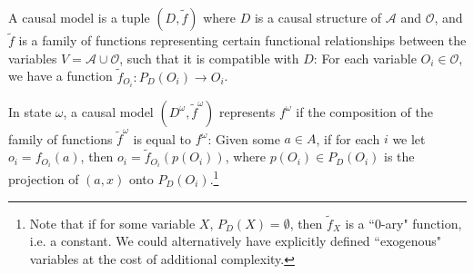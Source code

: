 \begin{definition} \label{def:causalmodel}
	A causal model is a tuple $(D,\tilde f)$ where $D$ is a causal structure of $\mathcal A$ and $\mathcal O$, and $\tilde f$ is a family of functions representing certain functional relationships between the variables $V=\mathcal A\cup\mathcal O$, such that it is compatible with $D$: For each variable $O_i\in \mathcal O$, we have a function $\tilde f_{O_i}\colon P_D(O_i)\to O_i$.
	
	In state $\omega$, a causal model $(D^\omega,\tilde f^\omega)$ represents $f^\omega$ if the composition of the family of functions $\tilde f^\omega$ is equal to $f^\omega$: Given some $a\in A$, if for each $i$ we let $o_i=f_{O_i}(a)$, then $o_i=\tilde f_{O_i}(p(O_i))$, where $p(O_i)\in P_D(O_i)$ is the projection of $(a,x)$ onto $P_D(O_i)$.\footnote{Note that if for some variable $X$, $P_D(X)=\emptyset$, then $\tilde f_X$ is a ``$0$-ary" function, i.e. a constant. We could alternatively have explicitly defined ``exogenous" variables at the cost of additional complexity.} 
\end{definition}



